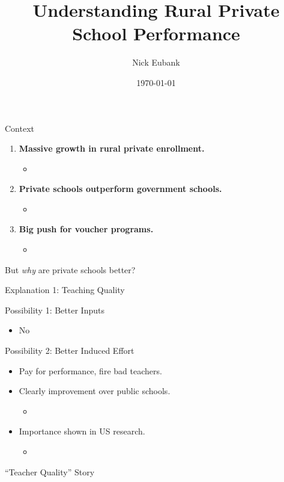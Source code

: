\documentclass{beamer}
\title{Understanding Rural Private School Performance}
\author{Nick Eubank}
\date{\today}
\begin{document}
 

\begin{frame}{}
	\titlepage
\end{frame}

\begin{frame}{Context}
	\begin{enumerate}
		\item \textbf{Massive growth in rural private enrollment. }
			\begin{itemize}
				\item \cite{Andrabi:2008ji, Pratham:2005vw}
			\end{itemize}
		\pause
		\item \textbf{Private schools outperform government schools.}
			\begin{itemize}
				\item \cite{Jimenez:1991wa, Jimenez:1995vg, Pratham:2005vw, Andrabi:2011hl, Desai:2009ty, Tooley:2003vf, Alderman:2003we, Alderman:2001wk}
		\end{itemize}	
		\pause
		\item \textbf{Big push for voucher programs.}
		\begin{itemize}
			\item \cite{Chakrabarti:2008vc, Kelkar:2006tq, Panagariya:2008wi}
		\end{itemize}
	\end{enumerate}
\pause
But \emph{why} are private schools better?

\end{frame}


\begin{frame}{Explanation 1: Teaching Quality}

Possibility 1: Better Inputs
\begin{itemize}
	\pause
	\item No
\end{itemize} 
\pause	

Possibility 2: Better Induced Effort
	\begin{itemize}
		\item Pay for performance, fire bad teachers.
		\pause
		\item Clearly improvement over public schools. 
		\begin{itemize}
			\item \cite{Muralidharan:2008tb, Chaudhury:2006vp}
		\end{itemize}
		\pause
		\item Importance shown in US research.
		\begin{itemize}
			\item \cite{Hanushek:1997tt,Hanushek:2003hz,Banerjee:2007wx}
		\end{itemize}
	\end{itemize}
\end{frame}
\pause
``Teacher Quality'' Story
\end{document}
